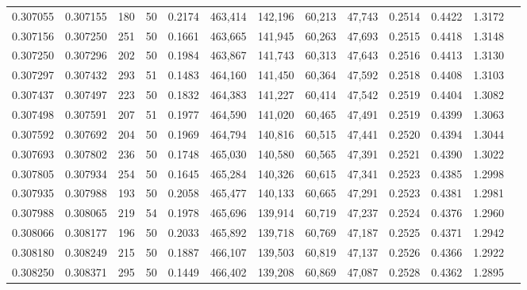 \begin{tabular}{rrrrrrrrrrrrr}
0.307055 & 0.307155 &   180 &  50 &                                     0.2174 & 463,414 & 142,196 &  60,213 &  47,743 & 0.2514 & 0.4422 & 1.3172 \\
0.307156 & 0.307250 &   251 &  50 &                                     0.1661 & 463,665 & 141,945 &  60,263 &  47,693 & 0.2515 & 0.4418 & 1.3148 \\
0.307250 & 0.307296 &   202 &  50 &                                     0.1984 & 463,867 & 141,743 &  60,313 &  47,643 & 0.2516 & 0.4413 & 1.3130 \\
0.307297 & 0.307432 &   293 &  51 &                                     0.1483 & 464,160 & 141,450 &  60,364 &  47,592 & 0.2518 & 0.4408 & 1.3103 \\
0.307437 & 0.307497 &   223 &  50 &                                     0.1832 & 464,383 & 141,227 &  60,414 &  47,542 & 0.2519 & 0.4404 & 1.3082 \\
0.307498 & 0.307591 &   207 &  51 &                                     0.1977 & 464,590 & 141,020 &  60,465 &  47,491 & 0.2519 & 0.4399 & 1.3063 \\
0.307592 & 0.307692 &   204 &  50 &                                     0.1969 & 464,794 & 140,816 &  60,515 &  47,441 & 0.2520 & 0.4394 & 1.3044 \\
0.307693 & 0.307802 &   236 &  50 &                                     0.1748 & 465,030 & 140,580 &  60,565 &  47,391 & 0.2521 & 0.4390 & 1.3022 \\
0.307805 & 0.307934 &   254 &  50 &                                     0.1645 & 465,284 & 140,326 &  60,615 &  47,341 & 0.2523 & 0.4385 & 1.2998 \\
0.307935 & 0.307988 &   193 &  50 &                                     0.2058 & 465,477 & 140,133 &  60,665 &  47,291 & 0.2523 & 0.4381 & 1.2981 \\
0.307988 & 0.308065 &   219 &  54 &                                     0.1978 & 465,696 & 139,914 &  60,719 &  47,237 & 0.2524 & 0.4376 & 1.2960 \\
0.308066 & 0.308177 &   196 &  50 &                                     0.2033 & 465,892 & 139,718 &  60,769 &  47,187 & 0.2525 & 0.4371 & 1.2942 \\
0.308180 & 0.308249 &   215 &  50 &                                     0.1887 & 466,107 & 139,503 &  60,819 &  47,137 & 0.2526 & 0.4366 & 1.2922 \\
0.308250 & 0.308371 &   295 &  50 &                                     0.1449 & 466,402 & 139,208 &  60,869 &  47,087 & 0.2528 & 0.4362 & 1.2895 \\

\end{tabular}
